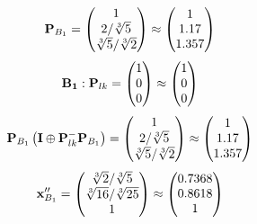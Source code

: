 \documentclass[10pt,a4paper]{article}
\begin{document}
	\[
		\bold{P}_{B_1} = 
		\begin{pmatrix}
			{1}{} \\
			{{2}} / {\sqrt[3]{5}} \\
			{\sqrt[3]{5}} / {\sqrt[3]{2}} \\
		\end{pmatrix}
		\approx
		\begin{pmatrix}
			1        \\
			1.17     \\
			1.357    \\
		\end{pmatrix}
	\]
	\[
		\bold{B_1}: \bold{P}_{lk} = 
		\begin{pmatrix}
			{1}{} \\
			{{0}}{} \\
			{{0}}{} \\
		\end{pmatrix}
		\approx
		\begin{pmatrix}
			1        \\
			0        \\
			0        \\
		\end{pmatrix}
	\]
	\[
		\bold{P}_{B_1}\left(\bold{I} \oplus \bold{P}_{lk}^{-}\bold{P}_{B_1}\right) = 
		\begin{pmatrix}
			{1}{} \\
			{{2}} / {\sqrt[3]{5}} \\
			{\sqrt[3]{5}} / {\sqrt[3]{2}} \\
		\end{pmatrix}
		\approx
		\begin{pmatrix}
			1        \\
			1.17     \\
			1.357    \\
		\end{pmatrix}
	\]
	\[
		\bold{x}''_{B_1} = 
		\begin{pmatrix}
			{\sqrt[3]{2}} / {\sqrt[3]{5}} \\
			{\sqrt[3]{16}} / {\sqrt[3]{25}} \\
			{1}{} \\
		\end{pmatrix}
		\approx
		\begin{pmatrix}
			0.7368   \\
			0.8618   \\
			1        \\
		\end{pmatrix}
	\]
\end{document}
